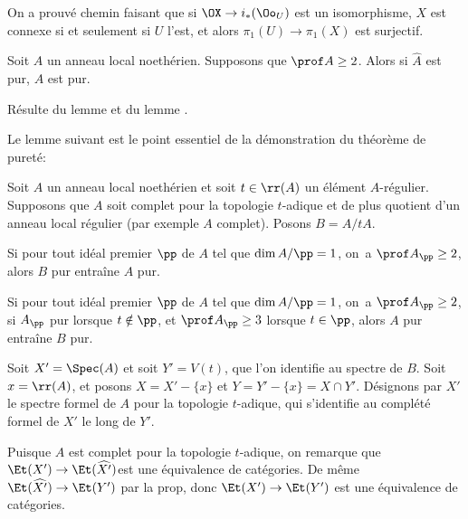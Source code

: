 \begin{remarque} \label{X.3.7}
On a prouv\'e chemin faisant que si $\OX\to i_\ast(\Oo_U)$ est un isomorphisme, $X$ est connexe si et seulement si $U$ l'est, et alors $\pi_1(U)\to\pi_1(X)$ est surjectif.
\end{remarque}

\begin{corollaire} \label{X.3.8}
Soit $A$ un anneau local noeth\'erien. Supposons que $\prof A\geq 2$. Alors si $\hat{A}$ est pur, $A$ est pur.
\end{corollaire}

R\'esulte du lemme  et du lemme .

Le lemme suivant est le point essentiel de la d\'emonstration du th\'eor\`eme de puret\'e:

\begin{lemme} \label{X.3.9}
Soit $A$ un anneau local noeth\'erien et soit $t\in\rr(A)$ un \'el\'ement $A$-r\'egulier. Supposons que $A$ soit complet pour la topologie $t$-adique et de plus quotient d'un anneau local r\'egulier (par exemple $A$ complet). Posons $B=A/tA$.
\begin{enumeratei}
\item
Si pour tout id\'eal premier $\pp$ de $A$ tel que $\dim A/\pp=1$, on~a $\prof A_{\pp}\geq 2$, alors $B$ pur entra\^ine $A$ pur.

\item
Si pour tout id\'eal premier $\pp$ de $A$ tel que $\dim A/\pp=1$, on~a $\prof A_{\pp}\geq 2$, si $A_\pp$ pur lorsque $t\notin\pp$, et \ignorespaces{} $\prof A_\pp\geq3$ lorsque $t\in\pp$, alors $A$ pur entra\^ine $B$ pur.
\end{enumeratei}
\end{lemme}

Soit $X'=\Spec(A)$ et soit $Y'=V(t)$, que l'on identifie au spectre de $B$. Soit $x=\rr(A)$, et posons $X=X'-\{x\}$ et $Y=Y'-\{x\}=X\cap Y'$. D\'esignons par $X'$ le spectre formel de $A$ pour la topologie $t$-adique, qui s'identifie au compl\'et\'e formel de $X'$ le long de $Y'$.

Puisque $A$ est complet pour la topologie $t$-adique, on remarque que $\Et(X')\to\Et(\widehat{X'})$\pageoriginale est une \'equivalence de cat\'egories. De m\^eme $\Et(\widehat{X'})\to\Et(Y')$ par la prop\ptbl {}, donc $\Et(X')\to\Et(Y')$ est une \'equivalence de cat\'egories.

